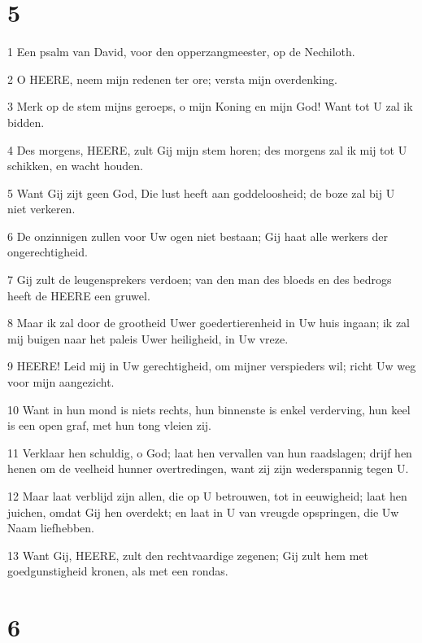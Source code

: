 \chapter{5}

\par 1 Een psalm van David, voor den opperzangmeester, op de Nechiloth.
\par 2 O HEERE, neem mijn redenen ter ore; versta mijn overdenking.
\par 3 Merk op de stem mijns geroeps, o mijn Koning en mijn God! Want tot U zal ik bidden.
\par 4 Des morgens, HEERE, zult Gij mijn stem horen; des morgens zal ik mij tot U schikken, en wacht houden.
\par 5 Want Gij zijt geen God, Die lust heeft aan goddeloosheid; de boze zal bij U niet verkeren.
\par 6 De onzinnigen zullen voor Uw ogen niet bestaan; Gij haat alle werkers der ongerechtigheid.
\par 7 Gij zult de leugensprekers verdoen; van den man des bloeds en des bedrogs heeft de HEERE een gruwel.
\par 8 Maar ik zal door de grootheid Uwer goedertierenheid in Uw huis ingaan; ik zal mij buigen naar het paleis Uwer heiligheid, in Uw vreze.
\par 9 HEERE! Leid mij in Uw gerechtigheid, om mijner verspieders wil; richt Uw weg voor mijn aangezicht.
\par 10 Want in hun mond is niets rechts, hun binnenste is enkel verderving, hun keel is een open graf, met hun tong vleien zij.
\par 11 Verklaar hen schuldig, o God; laat hen vervallen van hun raadslagen; drijf hen henen om de veelheid hunner overtredingen, want zij zijn wederspannig tegen U.
\par 12 Maar laat verblijd zijn allen, die op U betrouwen, tot in eeuwigheid; laat hen juichen, omdat Gij hen overdekt; en laat in U van vreugde opspringen, die Uw Naam liefhebben.
\par 13 Want Gij, HEERE, zult den rechtvaardige zegenen; Gij zult hem met goedgunstigheid kronen, als met een rondas.

\chapter{6}

